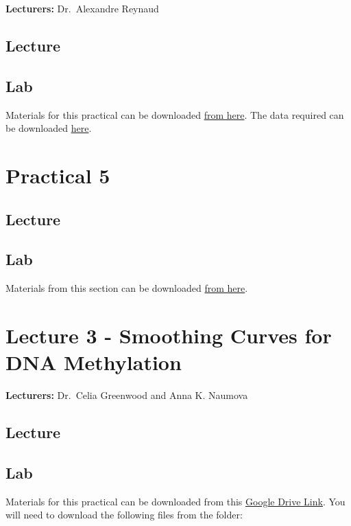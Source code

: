 \documentclass[
]{book}
\begin{document}
\textbf{Lecturers:} Dr.~Alexandre Reynaud

\section{Lecture}\label{lecture-5}

\section{Lab}\label{lab-4}

Materials for this practical can be downloaded \href{}{from here}. The data required can be downloaded \href{}{here}.

\chapter{Practical 5}\label{practical-5}

\section{Lecture}\label{lecture-6}

\section{Lab}\label{lab-5}

Materials from this section can be downloaded \href{https://github.com/aosakwe/CBW-INR-RMarkdown-Quarto}{from here}.

\chapter{Lecture 3 - Smoothing Curves for DNA Methylation}\label{lecture-3---smoothing-curves-for-dna-methylation}

\textbf{Lecturers:} Dr.~Celia Greenwood and Anna K. Naumova

\section{Lecture}\label{lecture-7}

\section{Lab}\label{lab-6}

Materials for this practical can be downloaded from this \href{https://drive.google.com/drive/folders/10MxDjaNVwez6mTuGxVRv98r7I8U9mHpt}{Google Drive Link}. You will need to download the following files from the folder:
\end{document}
